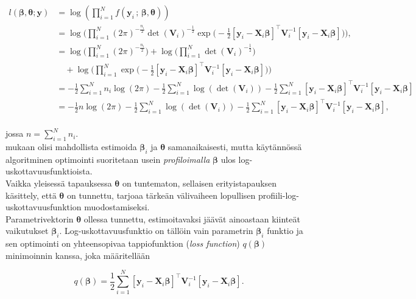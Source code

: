 \documentclass[finnish]{docopts}
\begin{document}
$$
\begin{aligned}
l(\bm{\beta}, \bm{\theta};\bm{y}) &= \log (\prod_{i=1}^{N} f(\bm{y}_i \, ; \, \bm{\beta}, \bm{\theta})) \\
&= \log \bigg(\prod_{i=1}^{N} (2\pi)^{-\frac{n_i}{2}} \det (\bm{V}_i)^{-\frac{1}{2}} \exp \big( -\frac{1}{2} [\bm{y}_i - \bm{X}_i \bm{\beta}]^\top \bm{V}_i^{-1} [\bm{y}_i - \bm{X}_i \bm{\beta}]\big) \bigg), \\
&= \log \bigg(\prod_{i=1}^{N} (2\pi)^{-\frac{n_i}{2}} \bigg) + \log \bigg(\prod_{i=1}^{N} \det (\bm{V}_i)^{-\frac{1}{2}} \bigg) \\
&\quad + \log \bigg(\prod_{i=1}^{N} \exp \big( -\frac{1}{2} [\bm{y}_i - \bm{X}_i \bm{\beta}]^\top \bm{V}_i^{-1} [\bm{y}_i - \bm{X}_i \bm{\beta}]\big) \bigg) \\
&= -\frac{1}{2} \sum\limits_{i=1}^{N} n_i \log (2\pi) -\frac{1}{2} \sum\limits_{i=1}^{N} \log (\det (\bm{V}_i)) -\frac{1}{2} \sum\limits_{i=1}^{N} [\bm{y}_i - \bm{X}_i \bm{\beta}]^\top \bm{V}_i^{-1} [\bm{y}_i - \bm{X}_i \bm{\beta}] \\
&= -\frac{1}{2} n \log (2\pi) -\frac{1}{2} \sum\limits_{i=1}^{N} \log (\det (\bm{V}_i)) -\frac{1}{2} \sum\limits_{i=1}^{N} [\bm{y}_i - \bm{X}_i \bm{\beta}]^\top \bm{V}_i^{-1} [\bm{y}_i - \bm{X}_i \bm{\beta}], \\
\end{aligned}
$$

jossa $n = \sum\limits_{i=1}^{N} n_i$.\\

\cite{west14} mukaan olisi mahdollista estimoida $\bm{\beta}_i$ ja $\bm{\theta}$ samanaikaisesti, mutta käytännössä algoritminen optimointi suoritetaan usein \textit{profiloimalla} $\bm{\beta}$ ulos log-uskottavuusfunktioista. \\

Vaikka yleisessä tapauksessa $\bm{\theta}$ on tuntematon, sellaisen erityistapauksen käsittely, että $\bm{\theta}$ on tunnettu, tarjoaa tärkeän välivaiheen lopullisen profiili-log-uskottavuusfunktion muodostamiseksi.\\

Parametrivektorin $\bm{\theta}$ ollessa tunnettu, estimoitavaksi jäävät ainoastaan kiinteät vaikutukset $\bm{\beta}_i$. Log-uskottavuusfunktio on tällöin vain parametrin $\bm{\beta}_i$ funktio ja sen optimointi on yhteensopivaa tappiofunktion (\textit{loss function}) $q(\bm{\beta})$ minimoinnin kanssa, joka määritellään

$$
q(\bm{\beta}) = \frac{1}{2} \sum\limits_{i=1}^{N} [\bm{y}_i - \bm{X}_i \bm{\beta}]^\top \bm{V}_i^{-1} [\bm{y}_i - \bm{X}_i \bm{\beta}].
$$
\end{document}
